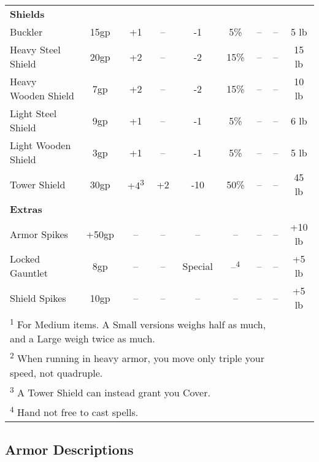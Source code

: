 \begin{table}[htb]
\begin{tabular}{l c c c c c c c c}
\multicolumn{9}{l}{\textbf{Shields}}\\
\hspace{.5cm}Buckler & 15gp & +1 & -- & -1 & 5\% & -- & -- & 5 lb\\
\hspace{.5cm}Heavy Steel Shield & 20gp & +2 & -- & -2 & 15\% & -- & -- & 15 lb\\
\hspace{.5cm}Heavy Wooden Shield & 7gp & +2 & -- & -2 & 15\% & -- & -- & 10 lb\\
\hspace{.5cm}Light Steel Shield & 9gp & +1 & -- & -1 & 5\% & -- & -- & 6 lb\\
\hspace{.5cm}Light Wooden Shield & 3gp & +1 & -- & -1 & 5\% & -- & -- & 5 lb\\
\hspace{.5cm}Tower Shield & 30gp & +4\textsuperscript{3} & +2 & -10 & 50\% & -- & -- & 45 lb\\

\multicolumn{9}{l}{\textbf{Extras}}\\
\hspace{.5cm}Armor Spikes & +50gp & -- & -- & -- & -- & -- & -- & +10 lb\\
\hspace{.5cm}Locked Gauntlet & 8gp & -- & -- & Special & --\textsuperscript{4} & -- & -- & +5 lb\\
\hspace{.5cm}Shield Spikes & 10gp & -- & -- & -- & -- & -- & -- & +5 lb\\

\multicolumn{8}{l}{\textsuperscript{1} For Medium items. A Small versions weighs half as much, and a Large weigh twice as much.}\\
\multicolumn{8}{l}{\textsuperscript{2} When running in heavy armor, you move only triple your speed, not quadruple.}\\
\multicolumn{8}{l}{\textsuperscript{3} A Tower Shield can instead grant you Cover.}\\
\multicolumn{8}{l}{\textsuperscript{4} Hand not free to cast spells.}\\
\end{tabular}
\end{table}

\subsection{Armor Descriptions}

